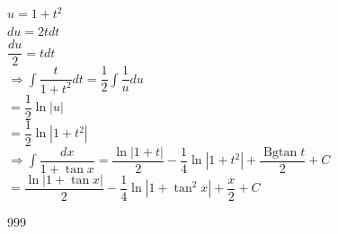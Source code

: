 \documentclass[a4paper]{article}
\begin{document}
$u = 1 + t^2$\\

$du = 2tdt$\\

$\dfrac{du}{2} = tdt$\\

$\Rightarrow \displaystyle\int \dfrac{t}{1 + t^2}dt
= \dfrac{1}{2}\displaystyle\int \dfrac{1}{u}du$\\

$= \dfrac{1}{2}\ln|u|$\\

$= \dfrac{1}{2}\ln|1+t^2|$\\

$\Rightarrow \displaystyle\int \dfrac{dx}{1+ \tan x}
= \dfrac{\ln|1+t|}{2}
-\dfrac{1}{4}\ln|1+t^2|
+\dfrac{\operatorname{Bgtan} t}{2} + C$\\

$= \dfrac{\ln|1+\tan x|}{2}
-\dfrac{1}{4}\ln|1+\tan^2 x|
+\dfrac{x}{2} + C$\\




















\begin{thebibliography}{999}
\end{thebibliography}
\end{document}
